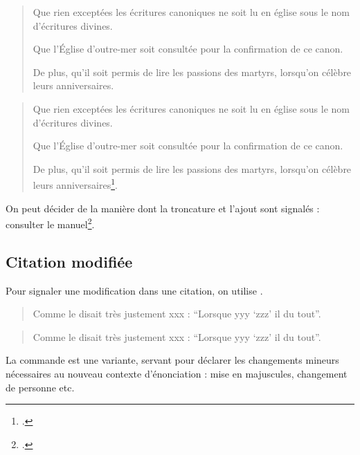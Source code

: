 \begin{latexcode}
\begin{quotation}
Que rien exceptées les écritures canoniques ne soit lu
en église sous le nom d’écritures divines.

Que l’Église d'outre-mer soit consultée pour la confirmation de ce canon.

De plus, qu'il soit permis de lire les passions des martyrs,
lorsqu'on célèbre leurs anniversaires.
\end{quotation}
\end{latexcode}

    \begin{quotation}
    Que rien exceptées les écritures canoniques ne soit lu en église sous le nom d’écritures divines.

Que l’Église d'outre-mer soit consultée pour la confirmation de ce canon.

De plus, qu'il soit permis de lire les passions des martyrs, lorsqu'on célèbre leurs anniversaires\footcite{BreveHippone}.
    \end{quotation}

\begin{plusloins}
On peut décider de la manière dont la troncature et l'ajout sont signalés : consulter le manuel\footcite{csquotes_ellipses}.
\end{plusloins}

\subsection{Citation modifiée}

Pour signaler une modification dans une citation, on utilise  .
\begin{latexcode}
\begin{quotation}
Comme le disait très justement xxx : \enquote{Lorsque yyy 
\enquote{zzz} il  du tout}.
\end{quotation}
\end{latexcode}

\begin{quotation}
    Comme le disait très justement xxx : \enquote{Lorsque yyy  \enquote{zzz} il  du tout}.
\end{quotation}

La commande  est une variante, servant pour déclarer les changements mineurs nécessaires au nouveau contexte d'énonciation : mise en majuscules, changement de personne etc.
